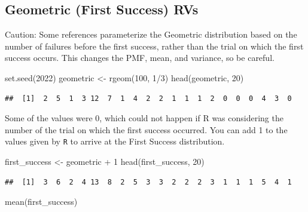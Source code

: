 \documentclass[
  11pt,
]{book}
\newenvironment{Shaded}{\begin{snugshade}}{\end{snugshade}}
\newcommand{\DecValTok}[1]{\textcolor[rgb]{0.00,0.00,0.81}{#1}}
\newcommand{\FunctionTok}[1]{\textcolor[rgb]{0.00,0.00,0.00}{#1}}
\newcommand{\NormalTok}[1]{#1}
\newcommand{\OtherTok}[1]{\textcolor[rgb]{0.56,0.35,0.01}{#1}}
\newcommand{\SpecialCharTok}[1]{\textcolor[rgb]{0.00,0.00,0.00}{#1}}
\theoremstyle{definition}
\theoremstyle{definition}
\theoremstyle{definition}
\theoremstyle{definition}
\theoremstyle{remark}
\begin{document}
\hypertarget{geometric-first-success-rvs}{%
\subsection{Geometric (First Success) RVs}\label{geometric-first-success-rvs}}

Caution: Some references parameterize the Geometric distribution based on the number of failures before the first success, rather than the trial on which the first success occurs. This changes the PMF, mean, and variance, so be careful.

\begin{Shaded}
\begin{Highlighting}[]
\FunctionTok{set.seed}\NormalTok{(}\DecValTok{2022}\NormalTok{)}
\NormalTok{geometric }\OtherTok{\textless{}{-}} \FunctionTok{rgeom}\NormalTok{(}\DecValTok{100}\NormalTok{, }\DecValTok{1}\SpecialCharTok{/}\DecValTok{3}\NormalTok{)}
\FunctionTok{head}\NormalTok{(geometric, }\DecValTok{20}\NormalTok{)}
\end{Highlighting}
\end{Shaded}

\begin{verbatim}
##  [1]  2  5  1  3 12  7  1  4  2  2  1  1  1  2  0  0  0  4  3  0
\end{verbatim}

Some of the values were 0, which could not happen if R was considering the number of the trial on which the first success occurred. You can add 1 to the values given by \texttt{R} to arrive at the First Success distribution.

\begin{Shaded}
\begin{Highlighting}[]
\NormalTok{first\_success }\OtherTok{\textless{}{-}}\NormalTok{ geometric }\SpecialCharTok{+} \DecValTok{1}
\FunctionTok{head}\NormalTok{(first\_success, }\DecValTok{20}\NormalTok{)}
\end{Highlighting}
\end{Shaded}

\begin{verbatim}
##  [1]  3  6  2  4 13  8  2  5  3  3  2  2  2  3  1  1  1  5  4  1
\end{verbatim}

\begin{Shaded}
\begin{Highlighting}[]
\FunctionTok{mean}\NormalTok{(first\_success)}
\end{Highlighting}
\end{Shaded}
\end{document}
